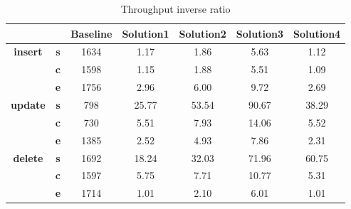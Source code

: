 \begin{table}[h]
\newcommand{\B}[1]{\colorbox{light-gray}{#1}}
 \centering
\caption{Throughput inverse ratio}\label{t:}
\begin{tabular}{ccccccc}
\toprule
&&\textbf{Baseline} & \textbf{Solution1} & \textbf{Solution2} & \textbf{Solution3} & \textbf{Solution4}\\
\midrule
\multirow{3}{*}{\textbf{insert}} & \textbf{s} & 1634 & 1.17 & 1.86 & 5.63 & 1.12\\
 & \textbf{c} & 1598 & 1.15 & 1.88 & 5.51 & 1.09\\
 & \textbf{e} & 1756 & 2.96 & 6.00 & 9.72 & 2.69\\
\midrule
\multirow{3}{*}{\textbf{update}} & \textbf{s} & 798 & 25.77 & 53.54 & 90.67 & 38.29\\
 & \textbf{c} & 730 & 5.51 & 7.93 & 14.06 & 5.52\\
 & \textbf{e} & 1385 & 2.52 & 4.93 & 7.86 & 2.31\\
\midrule
\multirow{3}{*}{\textbf{delete}} & \textbf{s} & 1692 & 18.24 & 32.03 & 71.96 & 60.75\\
 & \textbf{c} & 1597 & 5.75 & 7.71 & 10.77 & 5.31\\
 & \textbf{e} & 1714 & 1.01 & 2.10 & 6.01 & 1.01\\
\bottomrule
\end{tabular}
\end{table}






